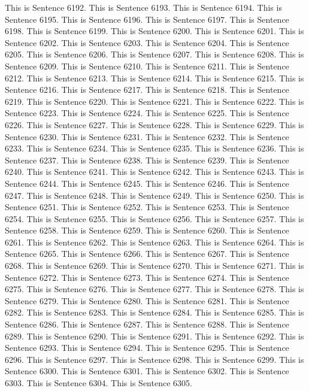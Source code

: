\documentclass{article}
\begin{document}
This is Sentence 6192.
This is Sentence 6193.
This is Sentence 6194.
This is Sentence 6195.
This is Sentence 6196.
This is Sentence 6197.
This is Sentence 6198.
This is Sentence 6199.
This is Sentence 6200.
This is Sentence 6201.
This is Sentence 6202.
This is Sentence 6203.
This is Sentence 6204.
This is Sentence 6205.
This is Sentence 6206.
This is Sentence 6207.
This is Sentence 6208.
This is Sentence 6209.
This is Sentence 6210.
This is Sentence 6211.
This is Sentence 6212.
This is Sentence 6213.
This is Sentence 6214.
This is Sentence 6215.
This is Sentence 6216.
This is Sentence 6217.
This is Sentence 6218.
This is Sentence 6219.
This is Sentence 6220.
This is Sentence 6221.
This is Sentence 6222.
This is Sentence 6223.
This is Sentence 6224.
This is Sentence 6225.
This is Sentence 6226.
This is Sentence 6227.
This is Sentence 6228.
This is Sentence 6229.
This is Sentence 6230.
This is Sentence 6231.
This is Sentence 6232.
This is Sentence 6233.
This is Sentence 6234.
This is Sentence 6235.
This is Sentence 6236.
This is Sentence 6237.
This is Sentence 6238.
This is Sentence 6239.
This is Sentence 6240.
This is Sentence 6241.
This is Sentence 6242.
This is Sentence 6243.
This is Sentence 6244.
This is Sentence 6245.
This is Sentence 6246.
This is Sentence 6247.
This is Sentence 6248.
This is Sentence 6249.
This is Sentence 6250.
This is Sentence 6251.
This is Sentence 6252.
This is Sentence 6253.
This is Sentence 6254.
This is Sentence 6255.
This is Sentence 6256.
This is Sentence 6257.
This is Sentence 6258.
This is Sentence 6259.
This is Sentence 6260.
This is Sentence 6261.
This is Sentence 6262.
This is Sentence 6263.
This is Sentence 6264.
This is Sentence 6265.
This is Sentence 6266.
This is Sentence 6267.
This is Sentence 6268.
This is Sentence 6269.
This is Sentence 6270.
This is Sentence 6271.
This is Sentence 6272.
This is Sentence 6273.
This is Sentence 6274.
This is Sentence 6275.
This is Sentence 6276.
This is Sentence 6277.
This is Sentence 6278.
This is Sentence 6279.
This is Sentence 6280.
This is Sentence 6281.
This is Sentence 6282.
This is Sentence 6283.
This is Sentence 6284.
This is Sentence 6285.
This is Sentence 6286.
This is Sentence 6287.
This is Sentence 6288.
This is Sentence 6289.
This is Sentence 6290.
This is Sentence 6291.
This is Sentence 6292.
This is Sentence 6293.
This is Sentence 6294.
This is Sentence 6295.
This is Sentence 6296.
This is Sentence 6297.
This is Sentence 6298.
This is Sentence 6299.
This is Sentence 6300.
This is Sentence 6301.
This is Sentence 6302.
This is Sentence 6303.
This is Sentence 6304.
This is Sentence 6305.
\end{document}
